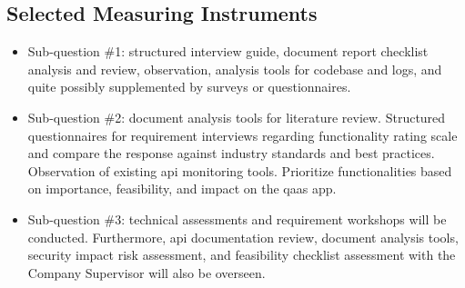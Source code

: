 \begin{multicols}{2}
\begin{itemize}[label=-]
          \subsection{Selected Measuring Instruments}
  \end{itemize}
  \begin{itemize}[label=-]
    \item Sub-question \#1: structured interview guide, document report checklist analysis and review,
          observation, analysis tools for codebase and logs, and quite possibly supplemented by surveys
          or questionnaires.
    \item Sub-question \#2: document analysis tools for literature review. Structured questionnaires for
          requirement interviews regarding functionality rating scale and compare the response against
          industry standards and best practices. Observation of existing \acrshort{api} monitoring tools.
          Prioritize functionalities based on importance, feasibility, and impact on the \acrshort{qaas} app.
    \item Sub-question \#3: technical assessments and requirement workshops will be conducted. Furthermore,
          \acrshort{api} documentation  review, document analysis tools, security impact risk assessment,
          and feasibility checklist assessment with the Company Supervisor will also be overseen.
  \end{itemize}

\end{multicols}
